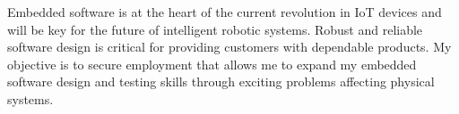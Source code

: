 

\begin{cvparagraph}

Embedded software is at the heart of the current revolution in IoT devices and will be key for the future of intelligent robotic systems.
Robust and reliable software design is critical for providing customers with dependable products.
My objective is to secure employment that allows me to expand my embedded software design and testing skills through exciting problems affecting physical systems.

\end{cvparagraph}
